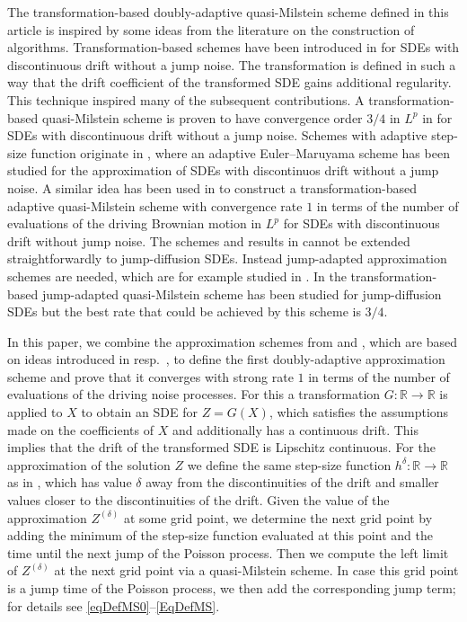 \documentclass[11pt,a4paper]{article}
\numberwithin{equation}{section}
\theoremstyle{definition}
\newcommand{\R}{{\mathbb{R}}}
\begin{document}
The transformation-based doubly-adaptive quasi-Milstein scheme defined in this article is inspired by some ideas from the literature on the construction of algorithms. Transformation-based schemes have been introduced in \cite{LS16,LS17} for SDEs with discontinuous drift without a jump noise. The transformation is defined in such a way that the drift coefficient of the transformed SDE gains additional regularity. This technique inspired many of the subsequent contributions. A transformation-based quasi-Milstein scheme is proven to have convergence order $3/4$ in $L^p$ in \cite{muellergronbach2019b} for SDEs with discontinuous drift without a jump noise. 
Schemes with adaptive step-size function originate in \cite{NSS19}, where an adaptive Euler--Maruyama scheme has been studied for the approximation of SDEs with discontinuos drift without a jump noise. A similar idea has been used in \cite{Yaroslavtseva2022} to construct a transformation-based adaptive quasi-Milstein scheme with convergence rate $1$ in terms of the number of evaluations of the driving Brownian motion in $L^p$ for SDEs with discontinuous drift without jump noise. The schemes and results in \cite{muellergronbach2019b, Yaroslavtseva2022} cannot be extended straightforwardly to jump-diffusion SDEs. 
Instead jump-adapted approximation schemes are needed, which are for example studied in \cite{PBL2010, kelly2025strong, PSS2024JMS}. In \cite{PSS2024JMS} the transformation-based jump-adapted quasi-Milstein scheme has been studied for jump-diffusion SDEs but the best rate that could be achieved by this scheme is $3/4$. 

In this paper, we combine the approximation schemes from \cite{Yaroslavtseva2022} and \cite{PSS2024JMS}, which are based on ideas introduced in \cite{NSS19} resp.~\cite{PBL2010}, to define the first doubly-adaptive approximation scheme and prove that it converges with strong rate $1$ in terms of the number of evaluations of the driving noise processes. For this a transformation $G\colon\R\to\R$ is applied to $X$ to obtain an SDE for $Z=G(X)$, which satisfies the assumptions made on the coefficients of $X$ and additionally has a continuous drift. This implies that the drift of the transformed SDE is Lipschitz continuous. For the approximation of the solution $Z$ we define the same step-size function $h^\delta\colon\R\to\R$ as in \cite{Yaroslavtseva2022}, which has value $\delta$ away from the discontinuities of the drift and smaller values closer to the discontinuities of the drift. Given the value of the approximation $Z^{(\delta)}$ at some grid point, we determine the next grid point by adding the minimum of the step-size function evaluated at this point and the time until the next jump of the Poisson process. Then we compute the left limit of $Z^{(\delta)}$ at the next grid point via a quasi-Milstein scheme. In case this grid point is a jump time of the Poisson process, we then add the corresponding jump term;  
for details see \eqref{eqDefMS0}--\eqref{EqDefMS}. 
\end{document}

